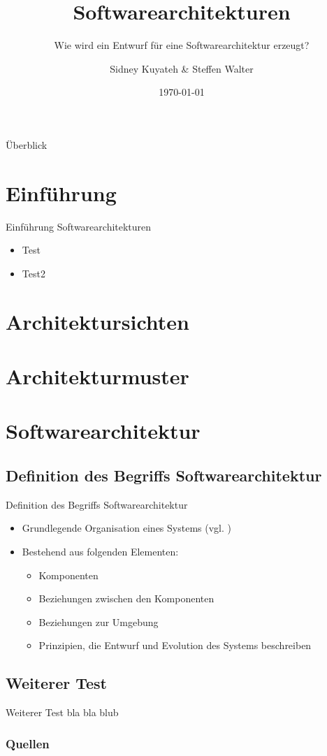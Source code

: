 \documentclass{beamer}
\title{Softwarearchitekturen}
\subtitle{Wie wird ein Entwurf für eine Softwarearchitektur erzeugt?}
\author{Sidney Kuyateh \& Steffen Walter}
\institute{Duale Hochschule Baden-Württemberg}
\date{\today}
\begin{document}
	\maketitle
	\begin{frame}{Überblick}
		\tableofcontents
	\end{frame}
		\section{Einführung}
		\begin{frame}{Einführung Softwarearchitekturen}
			\begin{itemize}
				\item Test
				\item Test2\cite[ S. 12]{prinzip}
			\end{itemize}
	\end{frame}
		
		\section{Architektursichten}
		\section{Architekturmuster}
	
	\section{Softwarearchitektur}
		\subsection{Definition des Begriffs Softwarearchitektur}
			\begin{frame}{Definition des Begriffs Softwarearchitektur}
				\begin{itemize}
					\item Grundlegende Organisation eines Systems (vgl. \cite{gi-lexikon})
					\item Bestehend aus folgenden Elementen:
					\begin{itemize}
						\item Komponenten
						\item Beziehungen zwischen den Komponenten
						\item Beziehungen zur Umgebung
						\item Prinzipien, die Entwurf und Evolution des Systems beschreiben
					\end{itemize}
				\end{itemize}
			\end{frame}
		\subsection{Weiterer Test}
			\begin{frame}{Weiterer Test}
				bla bla blub
			\end{frame}
	\begin{frame}[allowframebreaks]
		\frametitle{Quellen}
		\printbibliography[heading=none]
	\end{frame}
\end{document}

